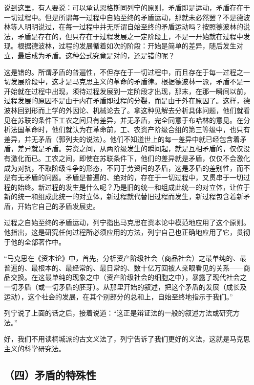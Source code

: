 说到这里，有人要说：可以承认恩格斯同列宁的原则，矛盾即是运动，矛盾存在于一切过程中。但是所谓每一过程中自始至终的矛盾运动，那就未必然罢？不是德波林等人明明说过，在每一过程中并无所谓自始至终的矛盾运动吗？按照德波林的说法，矛盾是存在的，但只存在于过程发展之一定阶段上，不是一开始就在过程中发现。根据德波林，过程的发展循着如次的阶段：开始是简单的差异，随后发生对立，最后成为矛盾。这种公式究竟是对的，还是错的呢？

这是错的。所谓矛盾的普遍性，不但存在于一切过程中，而且存在于每一过程之一切发展阶段中，这才是马克思主义的革命的矛盾律。根据德波林一派，矛盾不是一开始就在过程中出现，须待过程发展到一定阶段才出现，那末，在那一瞬间以前，过程发展的原因不是由于内在矛盾即过程的分裂，而是由于外在原因了。这样，德波林回到形而上学的外因论、机械论去了。拿这种见解去分析具体问题，他们就看见在苏联的条件下工农之间只有差异，并无矛盾，完全同意于布哈林的意见。在分析法国革命时，他们就认为在革命前，工、农资产阶级合组的第三等级中，也只有差异，并无矛盾（郭列夫的说法）。他们不知道世上的每一差异中就已经包含着矛盾，差异就是矛盾。劳资之间，从两阶级发生的瞬间起，就是互相矛盾的，仅仅没有激化而已。工农之间，即使在苏联条件下，他们的差异就是矛盾，仅仅不会激化成为对抗，不取阶级斗争的形态，不同于劳资间的矛盾，这是矛盾的差别性，而不是有无矛盾的问题。矛盾是普遍的、绝对的，存在于一切过程中，又贯串于一切过程的始终。新过程的发生是什么呢？乃是旧的统一和组成此统一的对立体，让位于新的统一和组成此统一的对立体，新过程就代替旧过程而发生，新过程包含着新矛盾，开始它自己的矛盾发展史。

过程之自始至终的矛盾运动，列宁指出马克思在资本论中模范地应用了这个原则。他指出，这是研究任何过程所必须应用的方法，列宁自己也正确地应用了它，贯彻于他的全部著作中。

“马克思在《资本论》中，首先，分析资产阶级社会（商品社会）之最单纯的、最普遍的、最根本的、最经常的、最日常的、数十亿万回被人亲眼看见的关系——商品交换。在这最单纯的现象之中（资产阶级社会的细胞之中），暴露了现代社会之一切矛盾（或一切矛盾的胚芽）。从那里开始的叙述，把这个矛盾的发展（成长及运动），这个社会的发展，在其个别部分的总和上，自始至终地指示于我们。”

列宁说了上面的话之后，接着说道：“这正是辩证法的一般的叙述方法或研究方法。”

好，我们不用读桐城派的古文义法了，列宁告诉了我们更好的义法，这就是马克思主义的科学研究法。

\subsection{（四）矛盾的特殊性}

